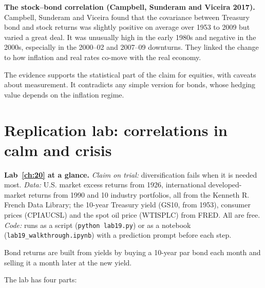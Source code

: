 \textbf{The stock--bond correlation (Campbell, Sunderam and Viceira 2017).} Campbell, Sunderam and Viceira found that the covariance between Treasury bond and stock returns was slightly positive on average over 1953 to 2009 but varied a great deal. It was unusually high in the early 1980s and negative in the 2000s, especially in the 2000--02 and 2007--09 downturns. They linked the change to how inflation and real rates co-move with the real economy.

The evidence supports the statistical part of the claim for equities, with caveats about measurement. It contradicts any simple version for bonds, whose hedging value depends on the inflation regime.

\section{Replication lab: correlations in calm and crisis}
\label{sec:20-lab}

\begin{callout}
\textbf{Lab~\ref{ch:20} at a glance.} \emph{Claim on trial:} diversification fails when it is needed most. \emph{Data:} U.S. market excess returns from 1926, international developed-market returns from 1990 and 10 industry portfolios, all from the Kenneth R. French Data Library; the 10-year Treasury yield (GS10, from 1953), consumer prices (CPIAUCSL) and the spot oil price (WTISPLC) from FRED. All are free. \emph{Code:} runs as a script (\texttt{python lab19.py}) or as a notebook (\texttt{lab19\_walkthrough.ipynb}) with a prediction prompt before each step.
\end{callout}

Bond returns are built from yields by buying a 10-year par bond each month and selling it a month later at the new yield.

The lab has four parts:

